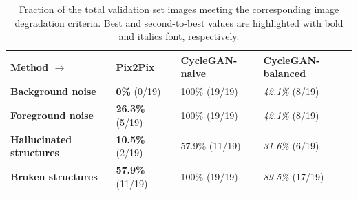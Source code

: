 
\begin{table}[h!]
    \footnotesize
    \centering
    \begin{tabular}{l || lll}
         \hline
         \textbf{Method} $\rightarrow$     & Pix2Pix                    & CycleGAN-naive  & CycleGAN-balanced          \\
         \hline
         \textbf{Background noise}         & \textbf{0\%} (0/19)        & 100\% (19/19)   & \textit{42.1\%} (8/19)     \\
         \textbf{Foreground noise}         & \textbf{26.3\%} (5/19)     & 100\% (19/19)   & \textit{42.1\%} (8/19)     \\
         \textbf{Hallucinated structures}  & \textbf{10.5\%} (2/19)     & 57.9\% (11/19)   & \textit{31.6\%} (6/19)     \\
         \textbf{Broken structures}        & \textbf{57.9\%} (11/19)    & 100\% (19/19)   & \textit{89.5\%} (17/19)    \\
         \hline
    \end{tabular}
    \caption{Fraction of the total validation set images meeting the corresponding image degradation criteria. Best and second-to-best values are highlighted with bold and italics font, respectively.}
    \label{tab:hx4_image_quality_inspection}
\end{table}


